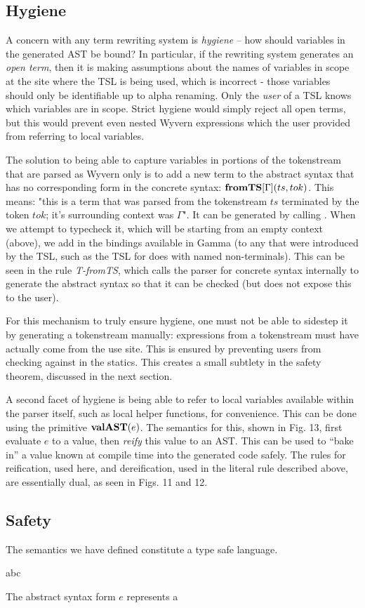 \subsection{Hygiene}
A concern with any term rewriting system is \emph{hygiene} -- how should variables in the generated AST be bound? In particular, if the rewriting system generates an \emph{open term}, then it is making assumptions about the names of variables in scope at the site where the TSL is being used, which is incorrect - those variables should only be identifiable up to alpha renaming. Only the \emph{user} of a TSL knows which variables are in scope. Strict hygiene would simply reject all open terms, but this would prevent even nested Wyvern expressions which the user provided from referring to local variables.

The solution to being able to capture variables in portions of the tokenstream that are parsed as Wyvern only is to add a new term to the abstract syntax that has no corresponding form in the concrete syntax: $\textbf{fromTS}[\Gamma](ts, tok)$. This means: "this is a term that was parsed from the tokenstream $ts$ terminated by the token $tok$; it's surrounding context was $\Gamma$". It can be generated by calling . When we attempt to typecheck it, which will be starting from an empty context (above), we add in the bindings available in Gamma (to any that were introduced by the TSL, such as the TSL for  does with named non-terminals). This can be seen in the rule \textit{T-fromTS}, which calls the parser for concrete syntax internally to generate the abstract syntax so that it can be checked (but does not expose this to the user).

For this mechanism to truly ensure hygiene, one must not be able to sidestep it by generating a tokenstream manually: expressions from a tokenstream must have actually come from the use site. This is ensured by preventing users from checking  against  in the statics. This creates a small subtlety in the safety theorem, discussed in the next section.

A second facet of hygiene is being able to refer to local variables available within the parser itself, such as local helper functions, for convenience. This can be done using the primitive $\textbf{valAST}(e)$. The semantics for this, shown in Fig. 13, first evaluate $e$ to a value, then \emph{reify} this value to an AST. This can be used to ``bake in'' a value known at compile time into the generated code safely. The rules for reification, used here, and dereification, used in the literal rule described above, are essentially dual, as seen in Figs. 11 and 12.

\subsection{Safety}
The semantics we have defined constitute a type safe language.
\begin{lemma}[A]
abc
\end{lemma}

The abstract syntax form $e$ represents a 
